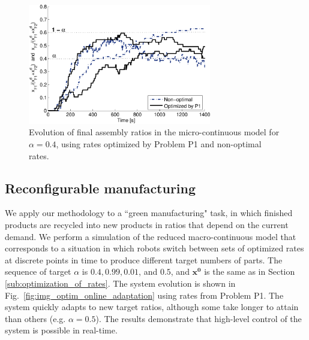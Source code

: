 


    \begin{figure}[t]
        \centering
            \includegraphics[width=8cm]{img/webots_results_alpha04.pdf}
        \caption{Evolution of final assembly ratios in the micro-continuous model
        for $\alpha=0.4$, using rates optimized by
         Problem P1 and non-optimal rates.}
        \label{fig:img_webots_results_alpha04}
    \end{figure}



\subsection{Reconfigurable manufacturing} %
\label{sub:green_manufacturing}

We apply our methodology to a ``green manufacturing" task, in which
finished products are recycled into new products in ratios that
depend on the current demand.  We perform a simulation of the
reduced macro-continuous model that corresponds to a situation in
which robots switch between sets of optimized rates at discrete
points in time to produce different target numbers of parts.  The
sequence of target $\alpha$ is $0.4, 0.99, 0.01$, and $0.5$, and
$\mathbf{x^0}$ is the same as in Section
\ref{sub:optimization_of_rates}.  The system evolution is shown in
Fig.~\ref{fig:img_optim_online_adaptation} using rates from Problem
P1.  The system quickly adapts to new target ratios, although some
take longer to attain than others (e.g. $\alpha=0.5$).  The results
demonstrate that high-level control of the system is possible in
real-time.


